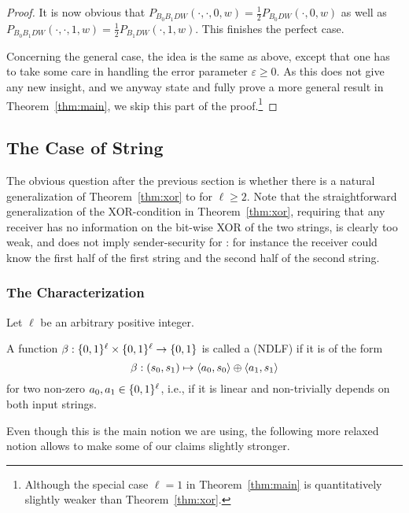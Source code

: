 \begin{proof}
It is now obvious that $P_{B_0 B_1 D W}(\cdot,\cdot,0,w) = \frac12 P_{B_0 D W}(\cdot,0,w)$ as well as $P_{B_0 B_1 D W}(\cdot,\cdot,1,w) = \frac12 P_{B_1 D W}(\cdot,1,w)$.
This finishes %
the perfect case. 

Concerning the general case, the idea is the same as above, except
that one has to take some care in handling the error parameter
$\varepsilon \geq 0$. As this does not give any new insight, and we
anyway state and fully prove a more general result in
Theorem~\ref{thm:main}, we skip this part of the
proof.\footnote{Although the special case $\ell = 1$ in
  Theorem~\ref{thm:main} is quantitatively slightly weaker than
  Theorem~\ref{thm:xor}. } 
\end{proof}


\subsection{The Case of String \pOT}

The obvious question after the previous section is whether there is a
natural generalization of Theorem~\ref{thm:xor} to %
\lStringOT for $\ell \geq 2$.  Note that the straightforward
generalization of the XOR-condition in Theorem~\ref{thm:xor},
requiring that any receiver has no information on the bit-wise XOR of
the two strings, is clearly too weak, and does not imply
sender-security for \RandlStringOT: for instance the receiver could
know the first half of the first string and the second half of the
second string.


\subsubsection{The Characterization}

Let $\ell$ be an arbitrary positive integer. 

\begin{definition}\label{def:linear}
A %
function $\beta:\{0,1\}^{\ell}\times\{0,1\}^{\ell} \rightarrow
\{0,1\}$ is called a  (NDLF) if it is of the
form
$$\beta: (s_0,s_1) \mapsto \langle a_0,s_0\rangle \oplus \langle a_1,s_1\rangle$$
for two non-zero $a_0,a_1 \in \{0,1\}^{\ell}$, i.e.,
if it is linear and non-trivially depends on both input strings.
\end{definition}
%
Even though this is the main notion we are using, the following more relaxed notion allows to make some of our claims slightly stronger. 

